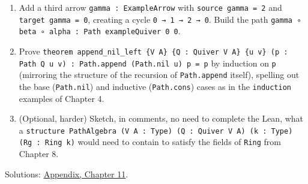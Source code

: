 \begin{enumerate}
\item
  Add a third arrow \texttt{gamma : ExampleArrow} with \texttt{source gamma = 2} and \texttt{target gamma = 0}, creating a cycle \texttt{0 → 1 → 2 → 0}. Build the path \texttt{gamma ∘ beta ∘ alpha : Path exampleQuiver 0 0}.
\item
  Prove \texttt{theorem append\_\allowbreak{}nil\_\allowbreak{}left \{V A\} \{Q : Quiver V A\} \{u v\} (p : Path Q u v) : Path.append (Path.nil u) p = p} by induction on \texttt{p} (mirroring the structure of the recursion of \texttt{Path.append} itself), spelling out the base (\texttt{Path.nil}) and inductive (\texttt{Path.cons}) cases as in the \texttt{induction} examples of Chapter 4.
\item
  (Optional, harder) Sketch, in comments, no need to complete the Lean, what a \texttt{structure PathAlgebra (V A : Type) (Q : Quiver V A) (k : Type) (Rg : Ring k)} would need to contain to satisfy the fields of \texttt{Ring} from Chapter 8.
\end{enumerate}

Solutions: \hyperref[sec:14-appendix-solutions:10-chapter-11:1]{Appendix, Chapter 11}.


